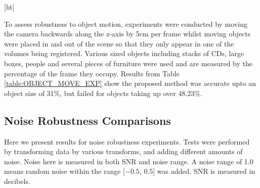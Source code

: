 \begin{table}[ht]
\hfill
\parbox{.45\linewidth}{
\centering
{}
\caption{Object Motion Test}
\label{table:OBJECT_MOVE_EXP}
}
\end{table}[ht]


To assess robustness to object motion, experiments were conducted by moving the camera backwards along the z-axis by 5cm per frame whilst moving objects were placed in and out of the scene so that they only appear in one of the volumes being registered. Various sized objects including stacks of CDs, large boxes, people and several pieces of furniture were used and are measured by the percentage of the frame they occupy. Results from Table \ref{table:OBJECT_MOVE_EXP} show the proposed method was accurate upto an object size of 31\%, but failed for objects taking up over 48.23\%.

\subsection{Noise Robustness Comparisons}

Here we present results for noise robustness experiments. Tests were performed by transforming data by various transforms, and adding different amounts of noise. Noise here is measured in both SNR and noise range. A noise range of 1.0 means random noise within the range [$-0.5$, $0.5$] was added. SNR is measured in decibels. 

